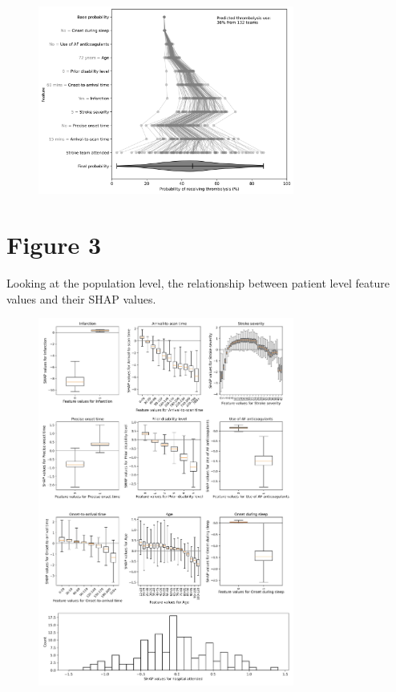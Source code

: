 \begin{figure}[!h]
\centering
\includegraphics[width=0.75\textwidth]{./images/21_shap_waterfall_with_violin_no_benchmark}
\caption{}
\label{fig:results_11}
\end{figure}

\newpage

\section{Figure 3}

Looking at the population level, the relationship between patient level feature values and their SHAP values.

\begin{figure}[!h]
\centering
\includegraphics[width=0.75\textwidth]{./images/03a_combined_shap}
\caption{}
\label{fig:results_feature_value_vs}
\end{figure}

